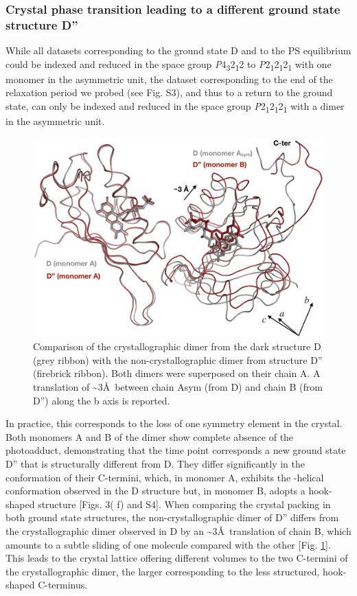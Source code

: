 \subsubsection{Crystal phase transition leading to a different ground state structure D''}
While all datasets corresponding to the ground state D and to the PS equilibrium could be indexed and reduced in the space group \textit{P}4\textsubscript{3}2\textsubscript{1}2 to \textit{P}2\textsubscript{1}2\textsubscript{1}2\textsubscript{1} with one monomer in the asymmetric unit, the dataset corresponding to the end of the relaxation period we probed (see Fig. S3), and thus to a return to the ground state, can only be indexed and reduced in the space group \textit{P}2\textsubscript{1}2\textsubscript{1}2\textsubscript{1} with a dimer in the asymmetric unit. 

\begin{figure}[H] %
    \centering
    \noindent \includegraphics[width=\textwidth]{images/LOV2/LOV2slow_Fig5.pdf}
    \hfill
    \caption{Comparison of the crystallographic dimer from the dark structure D (grey ribbon) with the non-crystallographic dimer from structure D'' (firebrick ribbon). Both dimers were superposed on their chain A. A translation of \textasciitilde3\AA\  between chain Asym (from D) and chain B (from D'') along the b axis is reported.}
    \label{fig:LOV2slowtwodark}
\end{figure}

In practice, this corresponds to the loss of one symmetry element in the crystal. Both monomers A and B of the dimer show complete absence of the photoadduct, demonstrating that the time point corresponds a new ground state D'' that is structurally different from D. They differ significantly in the conformation of their C-termini, which, in monomer A, exhibits the \textalpha-helical conformation observed in the D structure but, in monomer B, adopts a hook-shaped structure [Figs. 3( f) and S4]. When comparing the crystal packing in both ground state structures, the non-crystallographic dimer of D'' differs from the crystallographic dimer observed in D by an \textasciitilde3\AA\ translation of chain B, which amounts to a subtle sliding of one molecule compared with the other [Fig. \ref{fig:LOV2slowtwodark}]. This leads to the crystal lattice offering different volumes to the two C-termini of the crystallographic dimer, the larger corresponding to the less structured, hook-shaped C-terminus.

